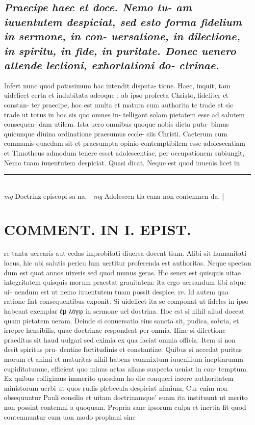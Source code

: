 \documentclass{article}
\begin{document}
\begin{pages}
\subsection*{\textit{Praecipe haec et doce. Nemo tu- am iuuentutem despiciat, sed esto forma fidelium in sermone, in con- uersatione, in dilectione, in spiritu, in fide, in puritate. Donec uenero attende lectioni, exhortationi do- ctrinae. }}\pstart Infert nunc quod potissimum hac intendit disputa- tione. Haec, inquit, tam uidelicet certa et indubitata adeoque ; ab ipso profecta Christo, fideliter et constan- ter praecipe, hoc est multa et matura cum authorita te trade et sic trade ut totus in hoc sis quo omnes in- telligant solam pietatem esse ad salutem consequen- dam utilem. Ista uero omnibus quoque nobis dicta puta- bimus quicunque diuina ordinatione praesumus eccle- siis Christi. Caeterum cum communis quaedam sit et praesumpta opinio contemptibilem esse adolescentiam et Timotheus admodum tenere esset adolescentiae, per occupationem subiungit, Nemo tuam iuuentutem despiciat. Quasi dicat, Neque est quod iuuenis licet in  \pend
\vspace{0.5cm}\noindent
\vspace{0.2cm}\rule{1cm}{0.2pt}\\ 
\hspace{0.2cm}\textit{mg}
\footnotesize Doctrinz episcopi sa na. 
\normalsize| 
\hspace{0.2cm}\textit{mg}
\footnotesize Adolescen tia cana non contemnen da. 
\normalsize| 
\section*{COMMENT. IN I. EPIST. }\pstart re tanta uerearis aut cedas improbitati diuersa docent tium. Alibi sit humanitati locus, hic ubi salutis pericu lum uertitur proferenda est authoritas. Neque spectan dum est quot annos uixeris sed quod munus geras. Hic senex est quisquis uitae integritatem quisquis morum praestat grauitatem: ita ergo uersandum tibi atque ui- uendum est ut nemo iuuentutem tuam possit despice. re. Id autem qua ratione fiat consequentibus exponit. Si uidelicet ita se componat ut fideles in ipso habeant exemplar ἐμ λόγῳ in sermone uel doctrina. Hoc est si nihil aliud doceat quam pietatem ueram. Deinde si conuersatio eius sancta sit, pudica, sobria, et irrepre hensibilis, quae doctrinae respondeat per omnia. Hine si dilectione praeditus sit haud uulgari sed eximia ex qua faciat omnia officia. Item si non desit spiritus pru- dentiae fortitudinis et constantiae. Quibus si accedat puritas morum et animi et maturitas nihil habens commixtum iuuenilium ineptiarumm cupiditatumue, efficient quo minus aetas alians suspecta ueniat in con- temptum. Ex quibus colligimus immerito quosdam ho die conqueri iacere authoritatem ministorum uerbi ut quos rudis plebecula despiciat nimium, Cur enim non obsequuntur Pauli consilio et uitam doctrinamque ́ suam ita instituunt ut merito non possint contemni a quoquam. Propria sane ipsorum culpa et inertia fit quod contemnuntur cum uon modo prophani sine  \pend

\end{pages}
\end{document}
